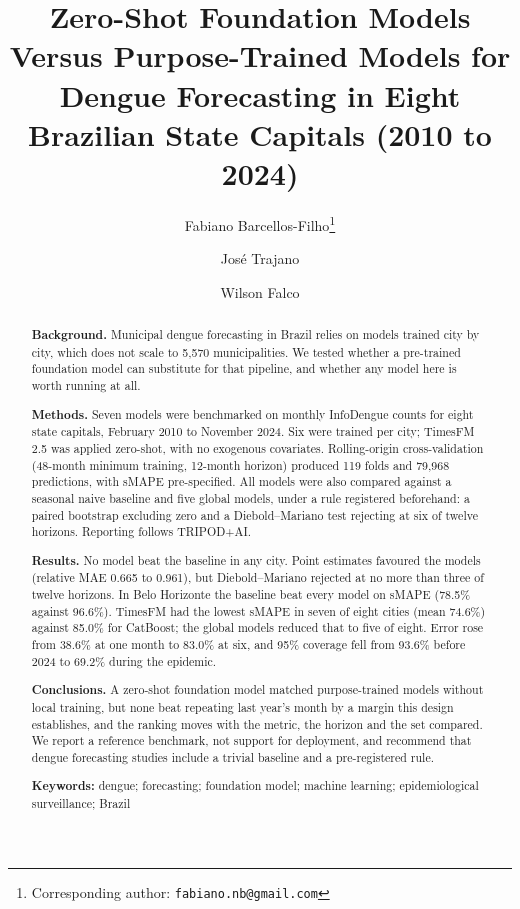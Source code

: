 \documentclass[11pt]{article}
\title{Zero-Shot Foundation Models Versus Purpose-Trained Models for Dengue
Forecasting in Eight Brazilian State Capitals (2010 to 2024)}
\author{Fabiano Barcellos-Filho\thanks{Corresponding author:
\texttt{fabiano.nb@gmail.com}} \and Jos\'e Trajano \and Wilson Falco}
\date{}
\begin{document}
\maketitle

\begin{abstract}
\noindent\textbf{Background.} Municipal dengue forecasting in Brazil relies on models
trained city by city, which does not scale to 5{,}570 municipalities. We tested whether a
pre-trained foundation model can substitute for that pipeline, and whether any model
here is worth running at all.

\noindent\textbf{Methods.} Seven models were benchmarked on monthly InfoDengue counts for
eight state capitals, February 2010 to November 2024. Six were trained per city; TimesFM
2.5 was applied zero-shot, with no exogenous covariates. Rolling-origin cross-validation
(48-month minimum training, 12-month horizon) produced 119 folds and 79{,}968 predictions,
with sMAPE pre-specified. All models were also compared against a seasonal naive baseline
and five global models, under a rule registered beforehand: a paired bootstrap
excluding zero and a Diebold--Mariano test rejecting at six of twelve horizons.
Reporting follows TRIPOD+AI.

\noindent\textbf{Results.} No model beat the baseline in any city. Point estimates
favoured the models (relative MAE 0.665 to 0.961), but Diebold--Mariano rejected at no
more than three of twelve horizons. In Belo Horizonte the
baseline beat every model on sMAPE (78.5\% against 96.6\%). TimesFM had the lowest sMAPE
in seven of eight cities (mean 74.6\%) against 85.0\% for CatBoost; the global models
reduced that to five of eight. Error rose from 38.6\% at one month to 83.0\% at six, and
95\% coverage fell from 93.6\% before 2024 to 69.2\% during the epidemic.

\noindent\textbf{Conclusions.} A zero-shot foundation model matched purpose-trained models
without local training, but none beat repeating last year's month by a margin this design
establishes, and the ranking moves with the metric, the horizon and the set compared. We
report a reference benchmark, not support for deployment, and recommend that dengue
forecasting studies include a trivial baseline and a pre-registered rule.

\vspace{0.6em}
\noindent\textbf{Keywords:} dengue; forecasting; foundation model; machine learning;
epidemiological surveillance; Brazil
\end{abstract}
\end{document}
